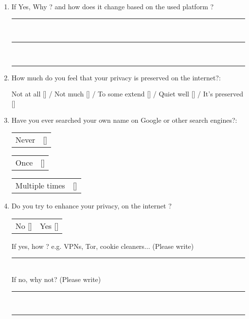 \begin{mdframed}[linewidth=0pt,backgroundcolor=lightgray!20,innertopmargin = 0.1cm,innerbottommargin = 0.5cm]
\begin{enumerate}
        \item If Yes, Why ? and how does it change based on the used platform ? \\
        \begin{left}
            \rule{0.82\textwidth}{.4pt}
        \end{left}\\
        \begin{left}
            \rule{0.82\textwidth}{.4pt}
        \end{left}\\
        \begin{left}
            \rule{0.82\textwidth}{.4pt}
        \end{left}
        \item How much do you feel that your privacy is preserved on the internet?:
        
        Not at all [\quad] / Not much [\quad] / To some extend [\quad] / Quiet well [\quad] / It's preserved [\quad]
        
        \item Have you ever searched your own name on Google or other search engines?:
        
        \begin{tabular}{ll}
           Never & [\quad]
        \end{tabular}
        \begin{tabular}{ll}
           Once & [\quad]
        \end{tabular}
        \begin{tabular}{ll}
           Multiple times & [\quad]
        \end{tabular}
        
        \item Do you try to enhance your privacy, on the internet ?
        \begin{tabular}{ll}
            No [\quad] & Yes [\quad]
        \end{tabular}

        If yes, how ? e.g. VPNs, Tor, cookie cleaners... (Please write) \\
        \begin{left}
            \rule{0.5\textwidth}{.4pt}
        \end{left}\\
        If no, why not? (Please write) \\
        \begin{left}
            \rule{0.8\textwidth}{.4pt}
        \end{left}\\
        \begin{left}
            \rule{0.5\textwidth}{.4pt}
        \end{left}
        

\end{enumerate}
\end{mdframed}
